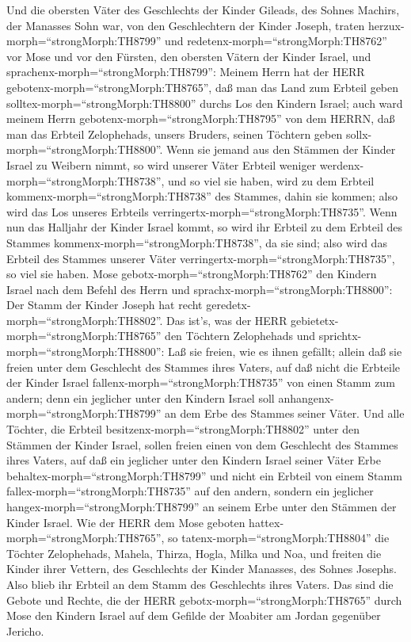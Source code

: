  Und die obersten Väter des Geschlechts der Kinder Gileads,
des Sohnes Machirs, der Manasses Sohn war, von den Geschlechtern der
Kinder Joseph, traten herzux-morph=``strongMorph:TH8799'' und
redetenx-morph=``strongMorph:TH8762'' vor Mose und vor den Fürsten, den
obersten Vätern der Kinder Israel,  und
sprachenx-morph=``strongMorph:TH8799'': Meinem Herrn hat der HERR
gebotenx-morph=``strongMorph:TH8765'', daß man das Land zum Erbteil
geben solltex-morph=``strongMorph:TH8800'' durchs Los den Kindern
Israel; auch ward meinem Herrn gebotenx-morph=``strongMorph:TH8795'' von
dem HERRN, daß man das Erbteil Zelophehads, unsers Bruders, seinen
Töchtern geben sollx-morph=``strongMorph:TH8800''.  Wenn sie
jemand aus den Stämmen der Kinder Israel zu Weibern nimmt, so wird
unserer Väter Erbteil weniger werdenx-morph=``strongMorph:TH8738'', und
so viel sie haben, wird zu dem Erbteil
kommenx-morph=``strongMorph:TH8738'' des Stammes, dahin sie kommen; also
wird das Los unseres Erbteils verringertx-morph=``strongMorph:TH8735''.
 Wenn nun das Halljahr der Kinder Israel kommt, so wird ihr
Erbteil zu dem Erbteil des Stammes kommenx-morph=``strongMorph:TH8738'',
da sie sind; also wird das Erbteil des Stammes unserer Väter
verringertx-morph=``strongMorph:TH8735'', so viel sie haben.
 Mose gebotx-morph=``strongMorph:TH8762'' den Kindern Israel
nach dem Befehl des Herrn und sprachx-morph=``strongMorph:TH8800'': Der
Stamm der Kinder Joseph hat recht geredetx-morph=``strongMorph:TH8802''.
 Das ist's, was der HERR
gebietetx-morph=``strongMorph:TH8765'' den Töchtern Zelophehads und
sprichtx-morph=``strongMorph:TH8800'': Laß sie freien, wie es ihnen
gefällt; allein daß sie freien unter dem Geschlecht des Stammes ihres
Vaters,  auf daß nicht die Erbteile der Kinder Israel
fallenx-morph=``strongMorph:TH8735'' von einen Stamm zum andern; denn
ein jeglicher unter den Kindern Israel soll
anhangenx-morph=``strongMorph:TH8799'' an dem Erbe des Stammes seiner
Väter.  Und alle Töchter, die Erbteil
besitzenx-morph=``strongMorph:TH8802'' unter den Stämmen der Kinder
Israel, sollen freien einen von dem Geschlecht des Stammes ihres Vaters,
auf daß ein jeglicher unter den Kindern Israel seiner Väter Erbe
behaltex-morph=``strongMorph:TH8799''  und nicht ein Erbteil
von einem Stamm fallex-morph=``strongMorph:TH8735'' auf den andern,
sondern ein jeglicher hangex-morph=``strongMorph:TH8799'' an seinem Erbe
unter den Stämmen der Kinder Israel.  Wie der HERR dem Mose
geboten hattex-morph=``strongMorph:TH8765'', so
tatenx-morph=``strongMorph:TH8804'' die Töchter Zelophehads,
 Mahela, Thirza, Hogla, Milka und Noa, und freiten die
Kinder ihrer Vettern,  des Geschlechts der Kinder Manasses,
des Sohnes Josephs. Also blieb ihr Erbteil an dem Stamm des Geschlechts
ihres Vaters.  Das sind die Gebote und Rechte, die der HERR
gebotx-morph=``strongMorph:TH8765'' durch Mose den Kindern Israel auf
dem Gefilde der Moabiter am Jordan gegenüber Jericho.
